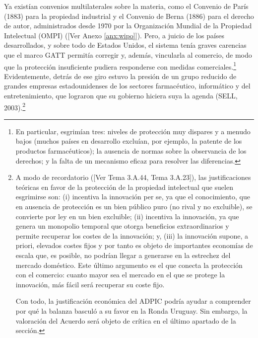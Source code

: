 \documentclass[10pt,a4paper]{article}
\newcommand{\authorfont}[1]{{\fontfamily{EBGaramond-TLF}\selectfont #1}}
\begin{document}
Ya existían convenios multilaterales sobre la materia, como el Convenio de París (1883) para la propiedad industrial y el Convenio de Berna (1886) para el derecho de autor, administrados desde 1970 por la Organización Mundial de la Propiedad Intelectual (OMPI) ([\authorfont{Ver Anexo \ref{anx:wipo}}]). Pero, a juicio de los países desarrollados, y sobre todo de Estados Unidos, el sistema tenía graves carencias que el marco GATT permitía corregir y, además, vincularla al comercio, de modo que la protección insuficiente pudiera responderse con medidas comerciales.\footnote{%
  En particular, esgrimían tres: niveles de protección muy dispares y a menudo bajos (muchos países en desarrollo excluían, por ejemplo, la patente de los productos farmacéuticos); la ausencia de normas sobre la observancia de los derechos; y la falta de un mecanismo eficaz para resolver las diferencias.
} Evidentemente, detrás de ese giro estuvo la presión de un grupo reducido de grandes empresas estadounidenses de los sectores farmacéutico, informático y del entretenimiento, que lograron que su gobierno hiciera suya la agenda (SELL, 2003).\footnote{%
  A modo de recordatorio ([\authorfont{Ver Tema 3.A.44, Tema 3.A.23}]), las justificaciones teóricas en favor de la protección de la propiedad intelectual que suelen esgrimirse son: (i) incentiva la innovación per se, ya que el conocimiento, que en ausencia de protección es un bien público puro (no rival y no excluible), se convierte por ley en un bien excluible; (ii) incentiva la innovación, ya que genera un monopolio temporal que otorga beneficios extraordinarios y permite recuperar los costes de la innovación; y, (iii) la innovación supone, a priori, elevados costes fijos y por tanto es objeto de importantes economías de escala que, es posible, no podrían llegar a generarse en la estrechez del mercado doméstico. Este último argumento es el que conecta la protección con el comercio: cuanto mayor sea el mercado en el que se protege la innovación, más fácil será recuperar su coste fijo.

  Con todo, la justificación económica del ADPIC podría ayudar a comprender por qué la balanza basculó a su favor en la Ronda Uruguay. Sin embargo, la valoración del Acuerdo será objeto de crítica en el último apartado de la sección.
}
\end{document}
